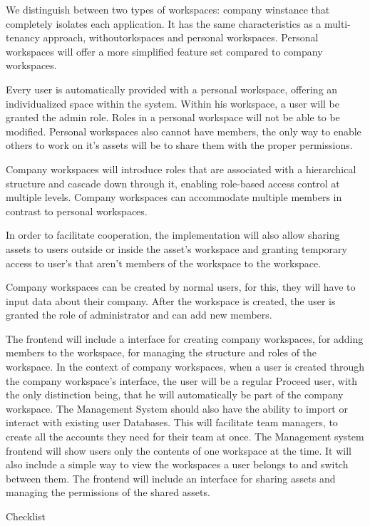 We distinguish between two types of workspaces: company winstance that completely isolates each application. It has
the same characteristics as a multi-tenancy approach, withoutorkspaces and personal workspaces.
Personal workspaces will offer a more simplified feature set compared to company workspaces.

Every user is automatically provided with a personal workspace, offering an individualized space within the system.
Within his workspace, a user will be granted the admin role.
Roles in a personal workspace will not be able to be modified.
Personal workspaces also cannot have members, the only way to enable others to work on it's assets will be to share them with the proper permissions.

Company workspaces will introduce roles that are associated with a hierarchical structure and cascade down through it, enabling role-based access control at multiple levels.
Company workspaces can accommodate multiple members in contrast to personal workspaces.

In order to facilitate cooperation, 
the implementation will also allow sharing assets to users outside or inside the asset's workspace and granting temporary access to user's that aren't members of the workspace to the workspace.

Company workspaces can be created by normal users, for this, they will have to input data about their company. After the workspace is created, the user is granted the role of administrator and can add new members.

The frontend will include a interface for creating company workspaces, for adding members to the workspace, for managing the structure and roles of the workspace.
In the context of company workspaces, when a user is created through the company workspace's interface, the user will be a regular Proceed user, with the only distinction being, that he will automatically be part of the company workspace.
The Management System should also have the ability to import or interact with existing user Databases.
This will facilitate team managers, to create all the accounts they need for their team at once.
The Management system frontend will show users only the contents of one workspace at the time. It will also include a simple way to view the workspaces a user belongs to and switch between them.
The frontend will include an interface for sharing assets and managing the permissions of the shared assets.

Checklist

